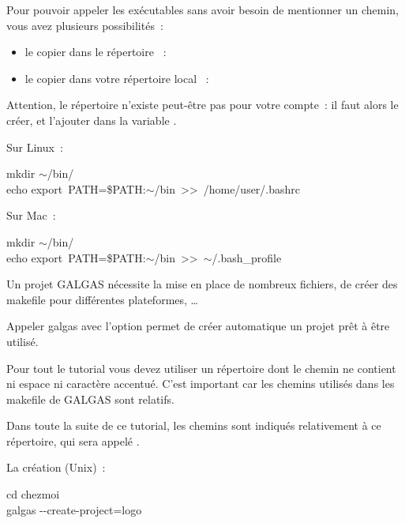 Pour pouvoir appeler les exécutables sans avoir besoin de mentionner un chemin, vous avez plusieurs possibilités~:
\begin{itemize}
  \item le copier dans le répertoire ~:  
  \item le copier dans votre répertoire local ~: 
\end{itemize}

Attention, le répertoire  n'existe peut-être pas pour votre compte~: il faut alors le créer, et l'ajouter dans la variable .

Sur Linux~:
\begin{SHELL}
mkdir $\sim$/bin/\\
echo \textquotesingle export~PATH=\$PATH{}:$\sim$/bin\textquotesingle~\textgreater{}\textgreater~/home/user/.bashrc
\end{SHELL}

Sur Mac~:
\begin{SHELL}
mkdir $\sim$/bin/\\
echo \textquotesingle export~PATH=\$PATH{}:$\sim$/bin\textquotesingle~\textgreater{}\textgreater~$\sim$/.bash\_profile
\end{SHELL}














Un projet GALGAS nécessite la mise en place de nombreux fichiers, de créer des makefile pour différentes plateformes, … 

Appeler galgas avec l'option  permet de créer automatique un projet prêt à être utilisé.

Pour tout le tutorial vous devez utiliser un répertoire dont le chemin ne contient ni espace ni caractère accentué. C'est important car les chemins utilisés dans les makefile de GALGAS sont relatifs.

Dans toute la suite de ce tutorial, les chemins sont indiqués relativement à ce répertoire, qui sera appelé .

La création (Unix)~:
\begin{SHELL}
cd chezmoi\\
galgas -{}-create-project=logo
\end{SHELL}

